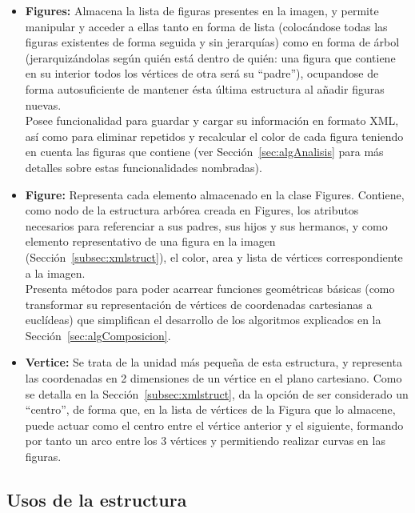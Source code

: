 	\begin{itemize}
	
		\item \textbf{Figures:} Almacena la lista de figuras presentes en la imagen, y permite manipular y acceder a ellas tanto en forma de lista (colocándose todas las figuras existentes de forma seguida y sin jerarquías) como en forma de árbol (jerarquizándolas según quién está dentro de quién: una figura que contiene en su interior todos los vértices de otra será su ``padre''), ocupandose de forma autosuficiente de mantener ésta última estructura al añadir figuras nuevas.\\
	
		Posee funcionalidad para guardar y cargar su información en formato XML, así como para eliminar repetidos y recalcular el color de cada figura teniendo en cuenta las figuras que contiene (ver Sección~\ref{sec:algAnalisis} para más detalles sobre estas funcionalidades nombradas).
		
		\item \textbf{Figure:} Representa cada elemento almacenado en la clase Figures. Contiene, como nodo de la estructura arbórea creada en Figures, los atributos necesarios para referenciar a sus padres, sus hijos y sus hermanos, y como elemento representativo de una figura en la imagen (Sección~\ref{subsec:xmlstruct}), el color, area y lista de vértices correspondiente a la imagen.\\
		
		Presenta métodos para poder acarrear funciones geométricas básicas (como transformar su representación de vértices de coordenadas cartesianas a euclídeas) que simplifican el desarrollo de los algoritmos explicados en la Sección~\ref{sec:algComposicion}.
		
		\item \textbf{Vertice:} Se trata de la unidad más pequeña de esta estructura, y representa las coordenadas en 2 dimensiones de un vértice en el plano cartesiano. Como se detalla en la Sección~\ref{subsec:xmlstruct}, da la opción de ser considerado un ``centro'', de forma que, en la lista de vértices de la Figura que lo almacene, puede actuar como el centro entre el vértice anterior y el siguiente, formando por tanto un arco entre los 3 vértices y permitiendo realizar curvas en las figuras.
	
	\end{itemize}
			
\subsection{Usos de la estructura}	

